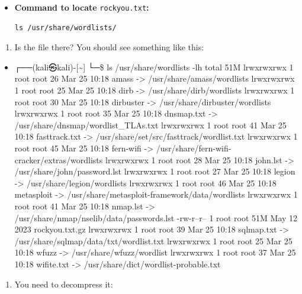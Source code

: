 \documentclass[11pt,a4paper]{article}
\providecommand{\tightlist}{%
  \setlength{\itemsep}{0pt}\setlength{\parskip}{0pt}}
\begin{document}
\begin{itemize}
\item
  \textbf{Command to locate} \texttt{rockyou.txt}\textbf{:}

\begin{verbatim}
ls /usr/share/wordlists/
\end{verbatim}
\end{itemize}

\begin{enumerate}
\def\labelenumi{\arabic{enumi}.}
\setcounter{enumi}{1}
\tightlist
\item
  Is the file there? You should see something like this:
\end{enumerate}

\begin{itemize}
\tightlist
\item
  ┌──(kali㉿kali)-{[}\textasciitilde{]} └─\$ ls /usr/share/wordlists -lh
  total 51M lrwxrwxrwx 1 root root 26 Mar 25 10:18 amass -\textgreater{}
  /usr/share/amass/wordlists lrwxrwxrwx 1 root root 25 Mar 25 10:18 dirb
  -\textgreater{} /usr/share/dirb/wordlists lrwxrwxrwx 1 root root 30
  Mar 25 10:18 dirbuster -\textgreater{} /usr/share/dirbuster/wordlists
  lrwxrwxrwx 1 root root 35 Mar 25 10:18 dnsmap.txt -\textgreater{}
  /usr/share/dnsmap/wordlist\_TLAs.txt lrwxrwxrwx 1 root root 41 Mar 25
  10:18 fasttrack.txt -\textgreater{}
  /usr/share/set/src/fasttrack/wordlist.txt lrwxrwxrwx 1 root root 45
  Mar 25 10:18 fern-wifi -\textgreater{}
  /usr/share/fern-wifi-cracker/extras/wordlists lrwxrwxrwx 1 root root
  28 Mar 25 10:18 john.lst -\textgreater{} /usr/share/john/password.lst
  lrwxrwxrwx 1 root root 27 Mar 25 10:18 legion -\textgreater{}
  /usr/share/legion/wordlists lrwxrwxrwx 1 root root 46 Mar 25 10:18
  metasploit -\textgreater{}
  /usr/share/metasploit-framework/data/wordlists lrwxrwxrwx 1 root root
  41 Mar 25 10:18 nmap.lst -\textgreater{}
  /usr/share/nmap/nselib/data/passwords.lst -rw-r--r-- 1 root root 51M
  May 12 2023 rockyou.txt.gz lrwxrwxrwx 1 root root 39 Mar 25 10:18
  sqlmap.txt -\textgreater{} /usr/share/sqlmap/data/txt/wordlist.txt
  lrwxrwxrwx 1 root root 25 Mar 25 10:18 wfuzz -\textgreater{}
  /usr/share/wfuzz/wordlist lrwxrwxrwx 1 root root 37 Mar 25 10:18
  wifite.txt -\textgreater{} /usr/share/dict/wordlist-probable.txt
\end{itemize}

\begin{enumerate}
\def\labelenumi{\arabic{enumi}.}
\setcounter{enumi}{2}
\tightlist
\item
  You need to decompress it:
\end{enumerate}
\end{document}
